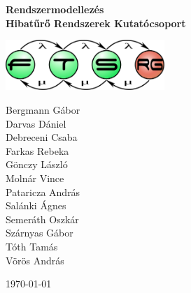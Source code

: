 \begin{titlepage}
\begin{center}
\vspace*{5cm}

{\huge \bfseries Rendszermodellezés}\\[0.8cm]

{\Large \bfseries Hibatűrő Rendszerek Kutatócsoport}\\[0.8cm]

\vspace{1cm}

\includegraphics[width=60mm,keepaspectratio]{figures/ftsrg-logo}\\

\vfill

Bergmann Gábor \\
Darvas Dániel \\
Debreceni Csaba \\
Farkas Rebeka \\
Gönczy László \\
Molnár Vince \\
Pataricza András \\
Salánki Ágnes \\
Semeráth Oszkár \\
Szárnyas Gábor \\
Tóth Tamás \\
Vörös András

\vfill

{\large \today}

\vspace{3cm}
\end{center}
\end{titlepage}
